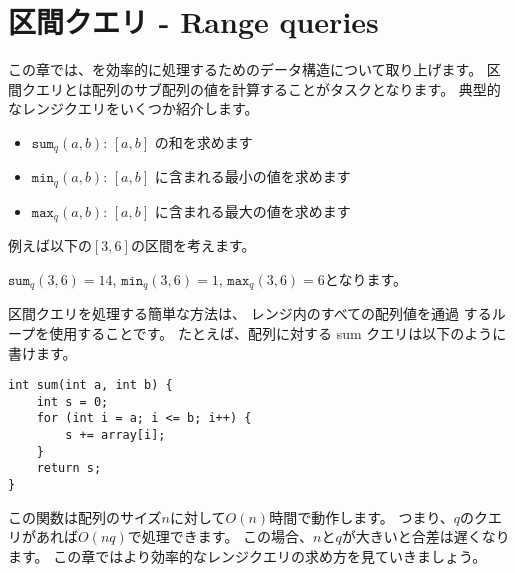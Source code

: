 \chapter{区間クエリ - Range queries}


この章では、を効率的に処理するためのデータ構造について取り上げます。
区間クエリとは配列のサブ配列の値を計算することがタスクとなります。
典型的なレンジクエリをいくつか紹介します。

\begin{itemize}
\item $\texttt{sum}_q(a,b)$: $[a,b]$ の和を求めます
\item $\texttt{min}_q(a,b)$: $[a,b]$ に含まれる最小の値を求めます
\item $\texttt{max}_q(a,b)$: $[a,b]$ に含まれる最大の値を求めます
\end{itemize}

例えば以下の$[3,6]$の区間を考えます。
\begin{center}
\end{center}
$\texttt{sum}_q(3,6)=14$,
$\texttt{min}_q(3,6)=1$, $\texttt{max}_q(3,6)=6$となります。

区間クエリを処理する簡単な方法は、
レンジ内のすべての配列値を通過 するループを使用することです。
たとえば、配列に対する sum クエリは以下のように書けます。

\begin{lstlisting}
int sum(int a, int b) {
    int s = 0;
    for (int i = a; i <= b; i++) {
        s += array[i];
    }
    return s;
}
\end{lstlisting}

この関数は配列のサイズ$n$に対して$O(n)$時間で動作します。
つまり、$q$のクエリがあれば$O(nq)$で処理できます。
この場合、$n$と$q$が大きいと合差は遅くなります。
この章ではより効率的なレンジクエリの求め方を見ていきましょう。

